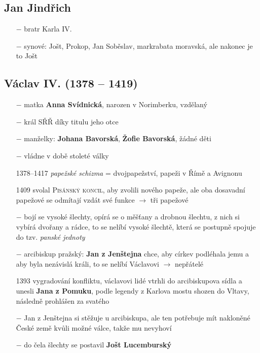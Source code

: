\documentclass{article}
\begin{document}
\subsection*{Jan Jindřich}
\begin{itemize}
    \vspace{-0.5em}
    \setlength\itemsep{0.15em}
    \item[$-$] bratr Karla IV.
    \item[$-$] synové: Jošt, Prokop, Jan Soběslav, markrabata moravská, ale nakonec je to Jošt
\end{itemize}

\subsection*{Václav IV. (1378 -- 1419)}
\begin{itemize}
    \vspace{-0.5em}
    \setlength\itemsep{0.15em}
    \item[$-$] matka \textbf{Anna Svídnická}, narozen v Norimberku, vzdělaný
    \item[$-$] král SŘŘ díky titulu jeho otce
    \item[$-$] manželky: \textbf{Johana Bavorská}, \textbf{Žofie Bavorská}, žádné děti
    \item[$-$] vládne v době stoleté války
    \item[1378--1417] \textit{papežské schizma} = dvojpapežství, papeži v Římě a Avignonu
    \item[1409] svolal \textsc{Pisánský koncil}, aby zvolili nového papeže, ale oba dosavadní papežové se odmítají vzdát své funkce $\rightarrow$ tři papežové
    \item[$-$] bojí se vysoké šlechty, opírá se o měšťany a drobnou šlechtu, z nich si vybírá dvořany a rádce, to se nelíbí vysoké šlechtě, která se postupně spojuje do tzv. \textit{panské jednoty}
    \item[$-$] arcibiskup pražský: \textbf{Jan z Jenštejna} chce, aby církev podléhala jemu a aby byla nezávislá králi, to se nelíbí Václavovi $\rightarrow$ nepřátelé
    \item[1393] vygradování konfliktu, václavovi lidé vtrhli do arcibiskupova sídla a unesli \textbf{Jana z Pomuku}, podle legendy z Karlova mostu shozen do Vltavy, následně prohlášen za svatého
    \item[$-$] Jan z Jenštejna si stěžuje u arcibiskupa, ale ten potřebuje mít nakloněné České země kvůli možné válce, takže mu nevyhoví
    \item[$-$] do čela šlechty se postavil \textbf{Jošt Lucemburský}

\end{itemize}
\end{document}
